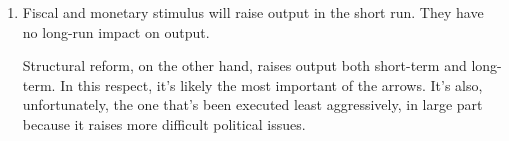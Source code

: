 \begin{enumerate}
\begin{enumerate}
\item Fiscal and monetary stimulus will raise output in the short run.
They have no long-run impact on output.

Structural reform, on the other hand, raises output both short-term and long-term.
In this respect, it's likely the most important of the arrows.
It's also, unfortunately, the one that's been executed least aggressively, 
in large part because it raises more difficult political issues.  
\end{enumerate}


%
%
%
%
%
%
%
%
%
\end{enumerate}
\setlength{\leftmargini}{\oldleftmargini}

